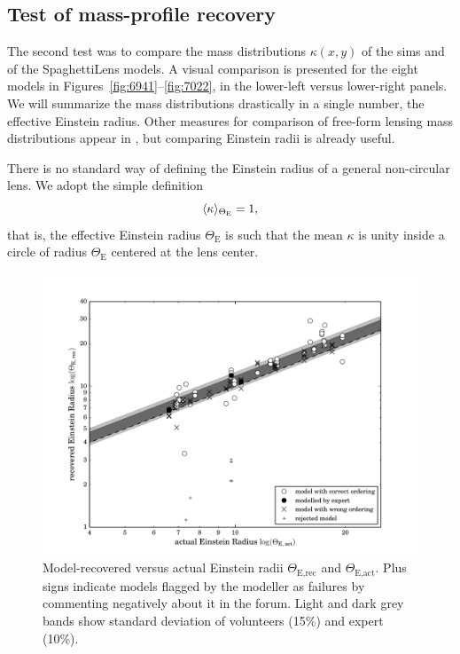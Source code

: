 \documentclass[usenatbib]{mn2e}
\newcommand{\spl}{SpaghettiLens\xspace}
\newcommand{\ERf}[1][]{$\Theta_\text{E#1}$\xspace} %
\begin{document}

\subsection{Test of mass-profile recovery} \label{sec:tests.t2}

The second test was to compare the mass distributions $\kappa(x,y)$ of
the sims and of the \spl models.  A visual comparison is presented for
the eight models in Figures~\ref{fig:6941}--\ref{fig:7022}, in the
lower-left versus lower-right panels.  We will summarize the mass
distributions drastically in a single number, the effective Einstein
radius.  Other measures for comparison of free-form lensing mass
distributions appear in \cite{2014arXiv1401.7990C}, but comparing
Einstein radii is already useful.

There is no standard way of defining the Einstein radius of a general
non-circular lens.  We adopt the simple definition
\begin{equation} \label{eq:effRE}
 \langle\kappa\rangle_{\Theta_{\rm E}} = 1,
\end{equation}
that is, the effective Einstein radius \ERf is such that the
mean $\kappa$ is unity inside a circle of radius \ERf centered at
the lens center.

\begin{figure}
  \centering
    \includegraphics[width=0.90\linewidth]{fig/eR_5}
  \caption{Model-recovered versus actual Einstein radii \ERf[,rec] and
    \ERf[,act].
    Plus signs indicate models flagged by the modeller as
    failures by commenting negatively about it in the forum. Light and dark grey
    bands show standard deviation of volunteers (15\%) and expert (10\%).}
  \label{fig:ER_per_sim}
\end{figure}
\end{document}
